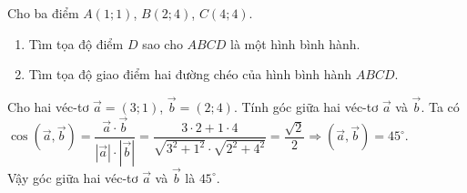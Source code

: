 \begin{bt}%
	Cho ba điểm $A(1;1)$, $B(2;4)$, $C(4;4)$.
	\begin{enumerate}
		\item Tìm tọa độ điểm $D$ sao cho $ABCD$ là một hình bình 	hành.
		\item Tìm tọa độ giao điểm hai đường chéo của hình bình hành $ABCD$.
	\end{enumerate}
\end{bt}

\begin{bt}%
Cho hai véc-tơ $\overrightarrow{a}=(3;1)$, $\overrightarrow{b}=(2;4)$. Tính góc giữa hai véc-tơ $\overrightarrow{a}$ và $\overrightarrow{b}$.
\loigiai
{
Ta có $\cos \left(\overrightarrow{a},\overrightarrow{b}\right)=\dfrac{\overrightarrow{a}\cdot\overrightarrow{b}}{\left|\overrightarrow{a}\right|\cdot\left|\overrightarrow{b}\right|}=\dfrac{3\cdot2+1\cdot4}{\sqrt{3^2+1^2}\cdot\sqrt{2^2+4^2}}=\dfrac {\sqrt 2}{2} \Rightarrow \left(\overrightarrow{a},\overrightarrow{b}\right)=45^{\circ}$. \\
Vậy góc giữa hai véc-tơ $\overrightarrow{a}$ và $\overrightarrow{b}$ là $45^{\circ}$.
}
\end{bt}

